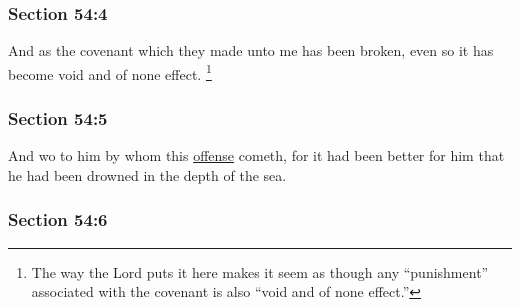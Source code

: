 
	\subsubsection{Section 54:4} %
		\label{DC54-4}

		And as the covenant which they made unto me has been broken, even so it has become void and of none effect.%
			\footnote{%
				The way the Lord puts it here makes it seem as though any ``punishment'' associated with the covenant is also ``void and of none effect.''
				}


	\subsubsection{Section 54:5} %
		\label{DC54-5}

		And wo to him by whom this \hyperref[OFFENSE]{offense} cometh, for it had been better for him that he had been drowned in the depth of the sea.


	\subsubsection{Section 54:6} %
		\label{DC54-6}

